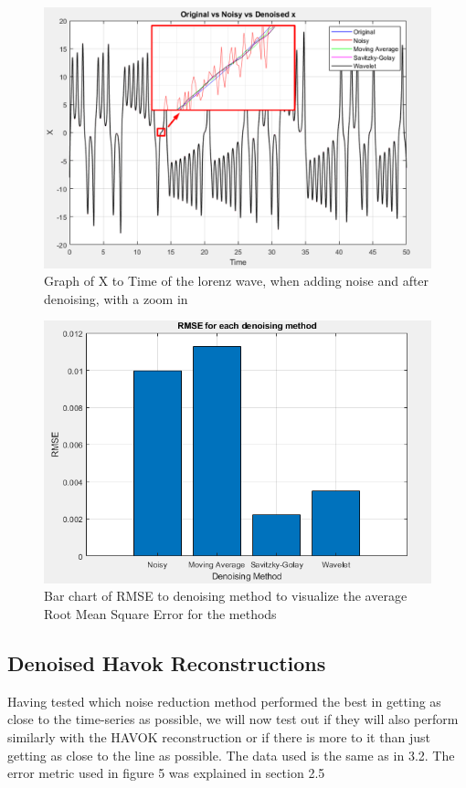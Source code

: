 \documentclass[11pt]{article}
\begin{document}
	\begin{figure}
		\centering
		\includegraphics[width=0.7\linewidth]{Figure1}
		\caption{Graph of X to Time of the lorenz wave, when adding noise and after denoising, with a zoom in}
		\label{fig:figure2}
	\end{figure}
	
	\begin{figure}
		\centering
		\includegraphics[width=0.7\linewidth]{Figure2}
		\caption{Bar chart of RMSE to denoising method to visualize the average Root Mean Square Error for the methods}
		\label{fig:figure3}
	\end{figure}
	
	
	

	
	\subsection{Denoised Havok Reconstructions}
	Having tested which noise reduction method performed the best in getting as close to the time-series as possible, we will now test out if they will also perform similarly with the HAVOK reconstruction or if there is more to it than just getting as close to the line as possible. The data used is the same as in 3.2. The error metric used in figure 5 was explained in section 2.5
	
\end{document}
